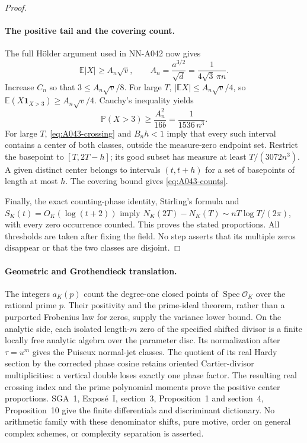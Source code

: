 \begin{proof}
\paragraph{The positive tail and the covering count.}
The full H\"older argument used in NN-A042 now gives
\[
 \mathbb E|X|\ge A_n\sqrt v,
 \qquad A_n=\frac{a^{3/2}}{\sqrt d}
                       =\frac1{4\sqrt3\,\pi n}.
\]
Increase $C_n$ so that $3\le A_n\sqrt v/8$.
For large $T$, $|\mathbb EX|\le A_n\sqrt v/4$, so
$\mathbb E(X\mathbf1_{X>3})\ge A_n\sqrt v/4$.
Cauchy's inequality yields
\[
            \mathbb P(X>3)\ge\frac{A_n^2}{16b}
                                  =\frac1{1536\,n^3}.
\]
For large $T$, \eqref{eq:A043-crossing} and $B_nh<1$
imply that every such interval contains a center of both
classes, outside the measure-zero endpoint set. Restrict the
basepoint to $[T,2T-h]$; its good subset has measure at least
$T/(3072n^3)$. A given distinct center belongs to intervals
$(t,t+h)$ for a set of basepoints of length at most $h$.
The covering bound gives \eqref{eq:A043-counts}.

Finally, the exact counting-phase identity, Stirling's formula
and $S_K(t)=O_K(\log(t+2))$ imply
$N_K(2T)-N_K(T)\sim nT\log T/(2\pi)$, with every
zero occurrence counted. This proves the stated proportions.
All thresholds are taken after fixing the field. No step
asserts that its multiple zeros disappear or that the two
classes are disjoint.
\end{proof}

\paragraph{Geometric and Grothendieck translation.}
The integers $a_K(p)$ count the degree-one closed points of
$\operatorname{Spec}\mathcal O_K$ over the rational prime $p$.
Their positivity and the prime-ideal theorem, rather than a
purported Frobenius law for zeros, supply the variance lower
bound. On the analytic side, each isolated length-$m$ zero
of the specified shifted divisor is a finite locally free
analytic algebra over the parameter disc. Its normalization
after $\tau=u^m$ gives the Puiseux normal-jet classes. The
quotient of its real Hardy section by the corrected phase
cosine retains oriented Cartier-divisor multiplicities: a
vertical double loses exactly one phase factor. The resulting
real crossing index and the prime polynomial moments prove
the positive center proportions. SGA~1, Expos\'e~I, section~3,
Proposition~1 and section~4, Proposition~10 give the finite
differentials and discriminant dictionary. No arithmetic
family with these denominator shifts, pure motive, order on
general complex schemes, or complexity separation is asserted.

